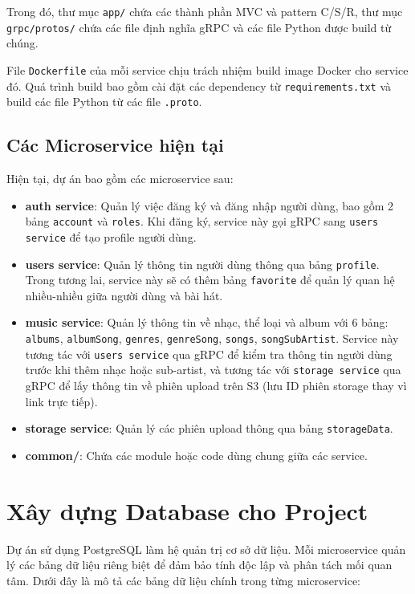 Trong đó, thư mục \texttt{app/} chứa các thành phần MVC và pattern C/S/R, thư mục \texttt{grpc/protos/} chứa các file định nghĩa gRPC và các file Python được build từ chúng.

File \texttt{Dockerfile} của mỗi service chịu trách nhiệm build image Docker cho service đó. Quá trình build bao gồm cài đặt các dependency từ \texttt{requirements.txt} và build các file Python từ các file \texttt{.proto}.

\subsection{Các Microservice hiện tại}
\label{subsec:existing_microservices}

Hiện tại, dự án bao gồm các microservice sau:

\begin{itemize}
    \item \textbf{auth service}: Quản lý việc đăng ký và đăng nhập người dùng, bao gồm 2 bảng \texttt{account} và \texttt{roles}. Khi đăng ký, service này gọi gRPC sang \texttt{users service} để tạo profile người dùng.
    \item \textbf{users service}: Quản lý thông tin người dùng thông qua bảng \texttt{profile}. Trong tương lai, service này sẽ có thêm bảng \texttt{favorite} để quản lý quan hệ nhiều-nhiều giữa người dùng và bài hát.
    \item \textbf{music service}: Quản lý thông tin về nhạc, thể loại và album với 6 bảng: \texttt{albums}, \texttt{albumSong}, \texttt{genres}, \texttt{genreSong}, \texttt{songs}, \texttt{songSubArtist}. Service này tương tác với \texttt{users service} qua gRPC để kiểm tra thông tin người dùng trước khi thêm nhạc hoặc sub-artist, và tương tác với \texttt{storage service} qua gRPC để lấy thông tin về phiên upload trên S3 (lưu ID phiên storage thay vì link trực tiếp).
    \item \textbf{storage service}: Quản lý các phiên upload thông qua bảng \texttt{storageData}.
    \item \textbf{common/}: Chứa các module hoặc code dùng chung giữa các service.
\end{itemize}

\section{Xây dựng Database cho Project}
\label{sec:database_design}

Dự án sử dụng PostgreSQL làm hệ quản trị cơ sở dữ liệu. Mỗi microservice quản lý các bảng dữ liệu riêng biệt để đảm bảo tính độc lập và phân tách mối quan tâm. Dưới đây là mô tả các bảng dữ liệu chính trong từng microservice:

